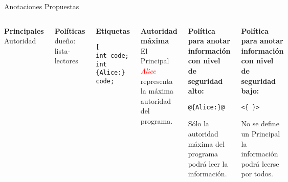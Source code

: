 \begin{frame}[fragile]{Anotaciones Propuestas}
\begin{columns}[T]
\begin{mdframed}
\scriptsize{
\textbf{Principales}\newline
Autoridad
}
\end{mdframed}
\vspace{-0.5em}
\begin{mdframed}
\scriptsize{
\textbf{Políticas}\newline
{dueño: lista-lectores}
}
\end{mdframed}
\vspace{-0.5em}
\begin{mdframed}

\scriptsize{
\textbf{Etiquetas}\newline}
\begin{lstlisting}[style=base2][
int code; 
int {Alice:} code; 
\end{lstlisting}
\end{mdframed}
\pause

\column{2in}
\begin{mdframed}
\scriptsize{
\textbf{Autoridad máxima}\newline
El Principal \emph{\textcolor{red}{Alice}} representa la máxima autoridad del
programa.}
\end{mdframed}
\vspace{-0.5em}

\begin{mdframed}
\scriptsize{
\textbf{Política para anotar información con nivel de seguridad alto:}
\vspace{-0.5em}
\begin{lstlisting}[style=base2]
@{Alice:}@
\end{lstlisting}
\vspace{-0.5em}
Sólo la autoridad máxima del programa podrá leer la información. 
}
\end{mdframed}
\vspace{-0.5em}

\begin{mdframed}
\scriptsize{
\textbf{Política para anotar información con nivel de seguridad bajo:}
\vspace{-0.5em}
\begin{lstlisting}[style=base2]
<{ }>
\end{lstlisting}
\vspace{-0.5em}
No se define un Principal la información podrá leerse por todos. }
\end{mdframed}
\end{columns}
\end{frame}

